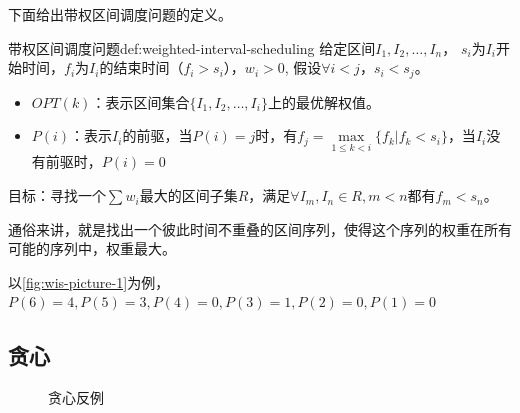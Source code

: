 下面给出带权区间调度问题的定义。

\begin{definition}{带权区间调度问题}{def:weighted-interval-scheduling}
  给定区间$I_1, I_2, \ldots, I_n$，
  $s_i$为$I_i$开始时间，$f_i$为$I_i$的结束时间（$f_i>s_i$），$w_i>0$, 假设$\forall i < j$，$ s_i<s_j$。
  \begin{itemize}
    \item $OPT(k)$：表示区间集合$\{ I_1, I_2, \ldots , I_i \}$上的最优解权值。
    \item $P(i)$：表示$I_i$的前驱，当$P(i)=j$时，有$f_j=\max\limits_{1 \leq k < i}\{f_k | f_k < s_i\}$，当$I_i$没有前驱时，$P(i)=0$
  \end{itemize}
  目标：寻找一个$\sum w_i$最大的区间子集$R$，满足$\forall I_m,I_n \in R, m < n \text{都有} f_m < s_n$。
\end{definition}

通俗来讲，就是找出一个彼此时间不重叠的区间序列，使得这个序列的权重在所有可能的序列中，权重最大。

\begin{remark}
  以\autoref{fig:wis-picture-1}为例，$P(6)=4, P(5)=3, P(4)=0, P(3)=1, P(2)=0, P(1)=0$
\end{remark}

\subsection{贪心}

\begin{figure}[hbt!]
  \centering
  \begin{subfigure}{.3\textwidth}
    \centering
    \caption{}\label{fig:wis-counterexample1}
  \end{subfigure}
  \begin{subfigure}{.3\textwidth}
    \centering
    \caption{}\label{fig:wis-counterexample2}
  \end{subfigure}
  \begin{subfigure}{.3\textwidth}
    \centering
    \caption{}\label{fig:wis-counterexample3}
  \end{subfigure}
  \caption{贪心反例}\label{fig:wis-counterexample}
\end{figure}

